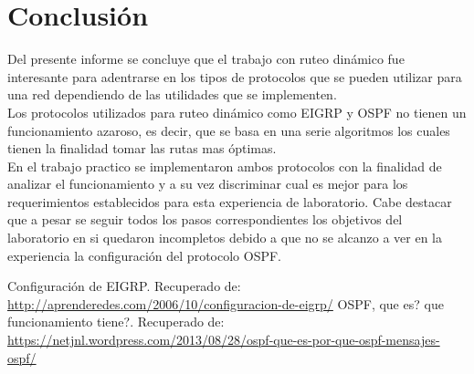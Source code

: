 \documentclass[spanish]{udpreport}
\begin{document}
\chapter{Conclusión}
Del presente informe se concluye que el trabajo con ruteo dinámico fue interesante para adentrarse en los tipos de protocolos que se pueden utilizar para una red dependiendo de las utilidades que se implementen. \\Los protocolos utilizados para ruteo dinámico como EIGRP y OSPF no tienen un funcionamiento azaroso, es decir, que se basa en una serie algoritmos los cuales tienen la finalidad tomar las rutas mas óptimas. \\En el trabajo practico se implementaron ambos protocolos con la finalidad de analizar el funcionamiento y a su vez discriminar cual es mejor para los requerimientos establecidos para esta experiencia de laboratorio. Cabe destacar que a pesar se seguir todos los pasos correspondientes los objetivos del laboratorio en si quedaron incompletos debido a que no se alcanzo a ver en la experiencia la configuración del protocolo OSPF.
\begin{thebibliography}{0}
Configuración de EIGRP. Recuperado de: \\ \url{http://aprenderedes.com/2006/10/configuracion-de-eigrp/}
OSPF, que es? que funcionamiento tiene?. Recuperado de: \\
\url{https://netjnl.wordpress.com/2013/08/28/ospf-que-es-por-que-ospf-mensajes-ospf/}
\end{thebibliography}
\listoffigures
\end{document}
